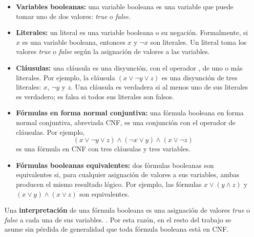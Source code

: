 \documentclass{report}
\theoremstyle{definition}
\theoremstyle{plain}
\theoremstyle{remark}
\begin{document}
\begin{itemize}
    \item \textbf{Variables booleanas:} una variable booleana es una variable que puede tomar uno de dos valores: \textit{true} o \textit{false}. 
  
    \item \textbf{Literales:} un literal es una variable booleana o su negación. Formalmente, si $x$ es una variable booleana, entonces $x$ y $\neg x$ son literales. Un literal toma los valores \textit{true} o \textit{false} según la asignación de valores a las variables.
  
    \item \textbf{Cláusulas:} una cláusula es una disyunción, con el operador , de uno o más literales. Por ejemplo, la cláusula $(x \vee \neg y \vee z)$ es una disyunción de tres literales: $x$, $\neg y$ y $z$. Una cláusula es verdadera si al menos uno de sus literales es verdadero; es falsa si todos sus literales son falsos.
    
    \item \textbf{Fórmulas en forma normal conjuntiva:} una fórmula booleana en forma normal conjuntiva, abreviada CNF, es una conjunción con el operador  de cláusulas. Por ejemplo,
    \[
      (x \vee \neg y \vee z) \wedge (\neg x \vee y) \wedge
      (x \vee \neg z)
    \]
    es una fórmula en CNF con tres cláusulas y tres variables.
  \item \textbf{Fórmulas booleanas equivalentes:} dos fórmulas booleanas
    son equivalentes si, para cualquier asignación de valores a sus
    variables, ambas producen el mismo resultado lógico. Por ejemplo,
    las fórmulas $x \vee (y \wedge z)$ y $(x \vee y) \wedge (x \vee z)$
    son equivalentes. 
\end{itemize}

Una \textbf{interpretación} de una fórmula booleana es una asignación de valores \textit{true} o \textit{false} a cada una de sus variables.  . Por esta razón, en el resto del trabajo se asume sin pérdida de generalidad que toda fórmula booleana está en CNF.
\end{document}
